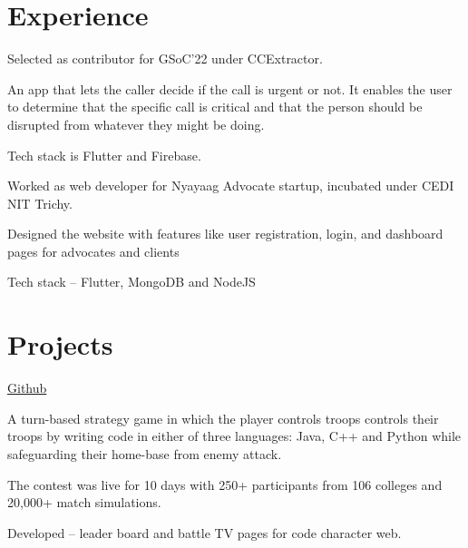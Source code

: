 \documentclass[]{deedy-resume-openfont}
\begin{document}
\hfill
\begin{minipage}[t]{0.69\textwidth} 

%
%
\section{Experience}
\hfill {}
\begin{tightemize}
    \item Selected as contributor for GSoC'22 under CCExtractor.
    \item An app that lets the caller decide if the call is urgent or not. It enables the user to determine that the specific call is critical and that the person should be disrupted from whatever they might be doing.
    \item Tech stack is Flutter and Firebase.
\end{tightemize}
\sectionsep

\hfill {}
\begin{tightemize}
    \item Worked as web developer for Nyayaag Advocate startup, incubated under CEDI NIT Trichy.
    \item Designed the website with features like user registration, login, and dashboard pages for advocates and clients
    \item Tech stack – Flutter, MongoDB and NodeJS
\end{tightemize}

\sectionsep

%
%
\section{Projects}
\raggedright

\hfill \href{https://github.com/delta/codecharacter-web-2022}{Github}\\
\begin{tightemize}
    \item A turn-based strategy game in which the player controls troops controls their troops by writing code in either of three languages: Java, C++ and Python while safeguarding their home-base from enemy attack.
    \item   The contest was live for 10 days with 250+ participants from 106 colleges and 20,000+ match simulations. 
    \item Developed – leader board and battle TV pages for code character web.
\end{tightemize}
\sectionsep


\end{minipage}
\end{document}
